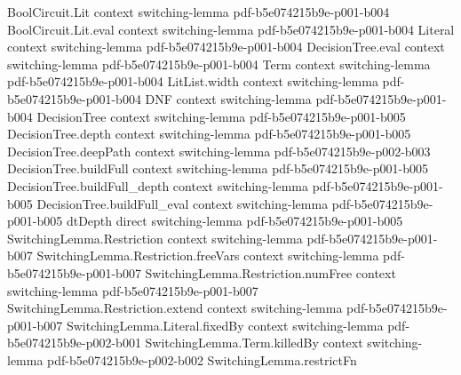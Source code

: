 \begin{lemma}
\label{SwitchingLemma.razborovDecode_encode}
\leanok
{}
\proofstep
  {BoolCircuit.Lit}
  {context}
  {switching-lemma}
  {pdf-b5e074215b9e-p001-b004}
\proofstep
  {BoolCircuit.Lit.eval}
  {context}
  {switching-lemma}
  {pdf-b5e074215b9e-p001-b004}
\proofstep
  {Literal}
  {context}
  {switching-lemma}
  {pdf-b5e074215b9e-p001-b004}
\proofstep
  {DecisionTree.eval}
  {context}
  {switching-lemma}
  {pdf-b5e074215b9e-p001-b004}
\proofstep
  {Term}
  {context}
  {switching-lemma}
  {pdf-b5e074215b9e-p001-b004}
\proofstep
  {LitList.width}
  {context}
  {switching-lemma}
  {pdf-b5e074215b9e-p001-b004}
\proofstep
  {DNF}
  {context}
  {switching-lemma}
  {pdf-b5e074215b9e-p001-b004}
\proofstep
  {DecisionTree}
  {context}
  {switching-lemma}
  {pdf-b5e074215b9e-p001-b005}
\proofstep
  {DecisionTree.depth}
  {context}
  {switching-lemma}
  {pdf-b5e074215b9e-p001-b005}
\proofstep
  {DecisionTree.deepPath}
  {context}
  {switching-lemma}
  {pdf-b5e074215b9e-p002-b003}
\proofstep
  {DecisionTree.buildFull}
  {context}
  {switching-lemma}
  {pdf-b5e074215b9e-p001-b005}
\proofstep
  {DecisionTree.buildFull_depth}
  {context}
  {switching-lemma}
  {pdf-b5e074215b9e-p001-b005}
\proofstep
  {DecisionTree.buildFull_eval}
  {context}
  {switching-lemma}
  {pdf-b5e074215b9e-p001-b005}
\proofstep
  {dtDepth}
  {direct}
  {switching-lemma}
  {pdf-b5e074215b9e-p001-b005}
\proofstep
  {SwitchingLemma.Restriction}
  {context}
  {switching-lemma}
  {pdf-b5e074215b9e-p001-b007}
\proofstep
  {SwitchingLemma.Restriction.freeVars}
  {context}
  {switching-lemma}
  {pdf-b5e074215b9e-p001-b007}
\proofstep
  {SwitchingLemma.Restriction.numFree}
  {context}
  {switching-lemma}
  {pdf-b5e074215b9e-p001-b007}
\proofstep
  {SwitchingLemma.Restriction.extend}
  {context}
  {switching-lemma}
  {pdf-b5e074215b9e-p001-b007}
\proofstep
  {SwitchingLemma.Literal.fixedBy}
  {context}
  {switching-lemma}
  {pdf-b5e074215b9e-p002-b001}
\proofstep
  {SwitchingLemma.Term.killedBy}
  {context}
  {switching-lemma}
  {pdf-b5e074215b9e-p002-b002}
\proofstep
  {SwitchingLemma.restrictFn}

\end{lemma}
